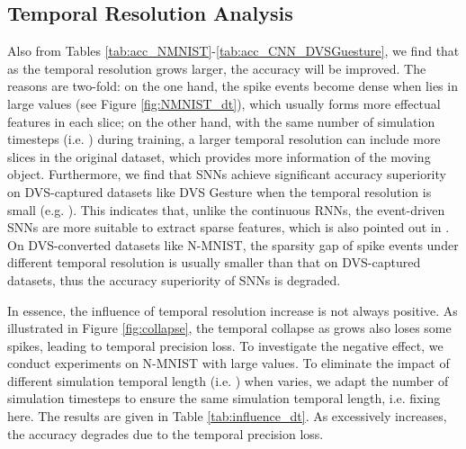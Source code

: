 \documentclass[journal,10pt,twocolumn]{IEEETran}
\begin{document}
\subsection{Temporal Resolution Analysis}\label{sec:generalization}

Also from Tables \ref{tab:acc_NMNIST}-\ref{tab:acc_CNN_DVSGuesture}, we find that as the temporal resolution grows larger, the accuracy will be improved. The reasons are two-fold: on the one hand, the spike events become dense when  lies in large values (see Figure \ref{fig:NMNIST_dt}), which usually forms more effectual features in each slice; on the other hand, with the same number of simulation timesteps (i.e. ) during training, a larger temporal resolution can include more slices in the original dataset, which provides more information of the moving object. Furthermore, we find that SNNs achieve significant accuracy superiority on DVS-captured datasets like DVS Gesture when the temporal resolution is small (e.g. ). This indicates that, unlike the continuous RNNs, the event-driven SNNs are more suitable to extract sparse features, which is also pointed out in \cite{deng2020rethinking}. On DVS-converted datasets like N-MNIST, the sparsity gap of spike events under different temporal resolution is usually smaller than that on DVS-captured datasets, thus the accuracy superiority of SNNs is degraded.

\begin{table}[!htbp]
\caption{Influence of temporal resolution under the same simulation temporal length.}
\label{tab:influence_dt}
\vspace{2pt}
\centering
\renewcommand\arraystretch{1.3}
\end{table}


In essence, the influence of temporal resolution increase is not always positive. As illustrated in Figure \ref{fig:collapse}, the temporal collapse as  grows also loses some spikes, leading to temporal precision loss. To investigate the negative effect, we conduct experiments on N-MNIST with large  values. To eliminate the impact of different simulation temporal length (i.e. ) when  varies, we adapt the number of simulation timesteps to ensure the same simulation temporal length, i.e. fixing  here. The results are given in Table \ref{tab:influence_dt}. As  excessively increases, the accuracy degrades due to the temporal precision loss.
\end{document}
